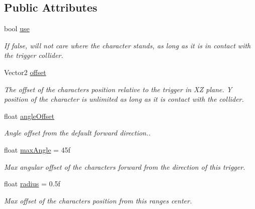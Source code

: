 \subsection*{Public Attributes}
\begin{DoxyCompactItemize}
\item 
bool \mbox{\hyperlink{class_root_motion_1_1_final_i_k_1_1_interaction_trigger_1_1_character_position_a9575cdb4b0f2515c33e0e0261fce37b6}{use}}
\begin{DoxyCompactList}\small\item\em If false, will not care where the character stands, as long as it is in contact with the trigger collider. \end{DoxyCompactList}\item 
Vector2 \mbox{\hyperlink{class_root_motion_1_1_final_i_k_1_1_interaction_trigger_1_1_character_position_af73922a4e9a0bde8d8400291343d8475}{offset}}
\begin{DoxyCompactList}\small\item\em The offset of the character\textquotesingle{}s position relative to the trigger in XZ plane. Y position of the character is unlimited as long as it is contact with the collider. \end{DoxyCompactList}\item 
float \mbox{\hyperlink{class_root_motion_1_1_final_i_k_1_1_interaction_trigger_1_1_character_position_ad5fce02163471b2e5f081b5f4eca5d63}{angle\+Offset}}
\begin{DoxyCompactList}\small\item\em Angle offset from the default forward direction.. \end{DoxyCompactList}\item 
float \mbox{\hyperlink{class_root_motion_1_1_final_i_k_1_1_interaction_trigger_1_1_character_position_af2af0f5b455c8111d56408f4203e3ac7}{max\+Angle}} = 45f
\begin{DoxyCompactList}\small\item\em Max angular offset of the character\textquotesingle{}s forward from the direction of this trigger. \end{DoxyCompactList}\item 
float \mbox{\hyperlink{class_root_motion_1_1_final_i_k_1_1_interaction_trigger_1_1_character_position_a2603c9412ea28d14088c4e1737a0bc5b}{radius}} = 0.\+5f
\begin{DoxyCompactList}\small\item\em Max offset of the character\textquotesingle{}s position from this range\textquotesingle{}s center. \end{DoxyCompactList}\item 

\end{DoxyCompactItemize}
